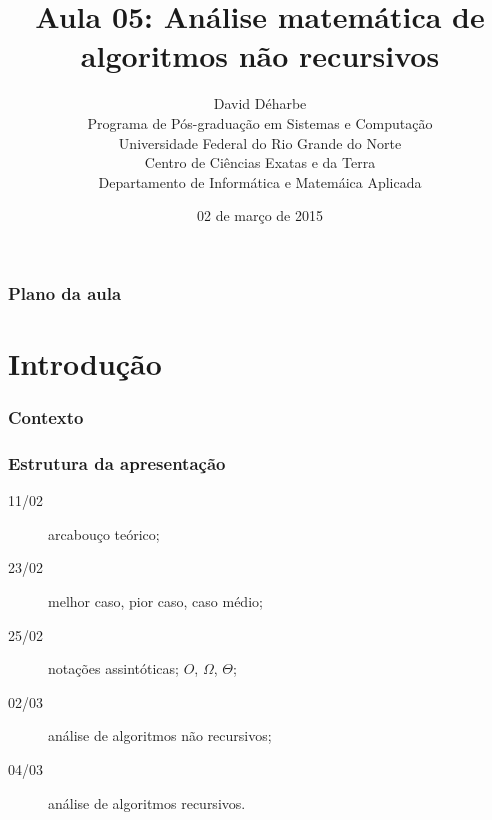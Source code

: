 \documentclass[handout]{beamer}
\title{Aula 05: Análise matemática de algoritmos não recursivos}
\author{David Déharbe \\
  Programa de Pós-graduação em Sistemas e Computação \\
  Universidade Federal do Rio Grande do Norte \\
  Centro de Ciências Exatas e da Terra \\
  Departamento de Informática e Matemáica Aplicada}
\date{02 de março de 2015}
\begin{document}
\begin{frame}
  \titlepage
\end{frame}

\begin{frame}
  \frametitle{Plano da aula}
  \tableofcontents
\end{frame}

\section{Introdução}

\begin{frame}

  \frametitle{Contexto}

  \begin{center}
  
  \end{center}
\end{frame}


\begin{frame}

  \frametitle{Estrutura da apresentação}

  \begin{description}
  \item[11/02] arcabouço teórico;
  \item[23/02] melhor caso, pior caso, caso médio;
  \item[25/02] notações assintóticas; $O$, $\Omega$, $\Theta$;
  \item[02/03] \alert{análise de algoritmos não recursivos};
  \item[04/03] análise de algoritmos recursivos.
  \end{description}
\end{frame}
\end{document}
